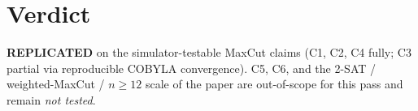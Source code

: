 \documentclass[11pt]{article}
\begin{document}
\section{Verdict}
\textbf{REPLICATED} on the simulator-testable MaxCut claims (C1, C2, C4 fully; C3 partial via reproducible COBYLA convergence). C5, C6, and the 2-SAT / weighted-MaxCut / $n\ge 12$ scale of the paper are out-of-scope for this pass and remain \emph{not tested}.


\end{document}
